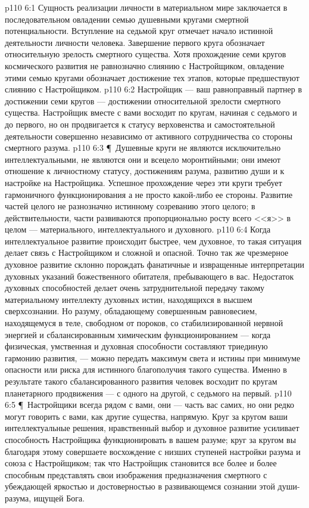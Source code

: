 \vs p110 6:1 Сущность реализации личности в материальном мире заключается в последовательном овладении семью душевными кругами смертной потенциальности. Вступление на седьмой круг отмечает начало истинной деятельности личности человека. Завершение первого круга обозначает относительную зрелость смертного существа. Хотя прохождение семи кругов космического развития не равнозначно слиянию с Настройщиком, овладение этими семью кругами обозначает достижение тех этапов, которые предшествуют слиянию с Настройщиком.
\vs p110 6:2 Настройщик --- ваш равноправный партнер в достижении семи кругов --- достижении относительной зрелости смертного существа. Настройщик вместе с вами восходит по кругам, начиная с седьмого и до первого, но он продвигается к статусу верховенства и самостоятельной деятельности совершенно независимо от активного сотрудничества со стороны смертного разума.
\vs p110 6:3 \P\ Душевные круги не являются исключительно интеллектуальными, не являются они и всецело моронтийными; они имеют отношение к личностному статусу, достижениям разума, развитию души и к настройке на Настройщика. Успешное прохождение через эти круги требует гармоничного функционирования  а не просто какой\hyp{}либо ее стороны. Развитие частей целого не разнозначно истинному созреванию этого целого; в действительности, части развиваются пропорционально росту всего <<я>> в целом --- материального, интеллектуального и духовного.
\vs p110 6:4 Когда интеллектуальное развитие происходит быстрее, чем духовное, то такая ситуация делает связь с Настройщиком и сложной и опасной. Точно так же чрезмерное духовное развитие склонно порождать фанатичные и извращенные интерпретации духовных указаний божественного обитателя, пребывающего в вас. Недостаток духовных способностей делает очень затруднительной передачу такому материальному интеллекту духовных истин, находящихся в высшем сверхсознании. Но разуму, обладающему совершенным равновесием, находящемуся в теле, свободном от пороков, со стабилизированной нервной энергией и сбалансированным химическим функционированием --- когда физическая, умственная и духовная способности составляют триединую гармонию развития, --- можно передать максимум света и истины при минимуме опасности или риска для истинного благополучия такого существа. Именно в результате такого сбалансированного развития человек восходит по кругам планетарного продвижения --- с одного на другой, с седьмого на первый.
\vs p110 6:5 \P\ Настройщики всегда рядом с вами, они --- часть вас самих, но они редко могут говорить с вами, как другие существа, напрямую. Круг за кругом ваши интеллектуальные решения, нравственный выбор и духовное развитие усиливает способность Настройщика функционировать в вашем разуме; круг за кругом вы благодаря этому совершаете восхождение с низших ступеней настройки разума и союза с Настройщиком; так что Настройщик становится все более и более способным представлять свои изображения предназначения смертного с убеждающей яркостью и достоверностью в развивающемся сознании этой души\hyp{}разума, ищущей Бога.
